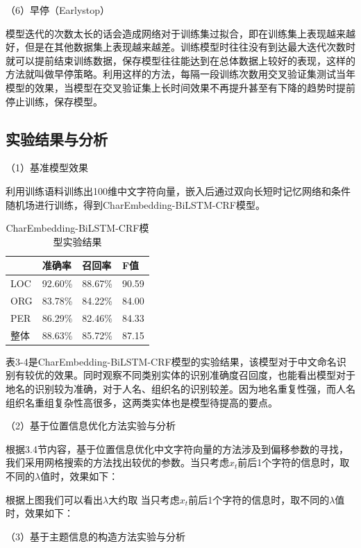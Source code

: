 \documentclass[winfonts,master,oneside,nobackinfo]{njuthesis}
\begin{document}
（6）早停（Earlystop）

模型迭代的次数太长的话会造成网络对于训练集过拟合，即在训练集上表现越来越好，但是在其他数据集上表现越来越差。训练模型时往往没有到达最大迭代次数时就可以提前结束训练数据，保存模型往往能达到在总体数据上较好的表现，这样的方法就叫做早停策略。利用这样的方法，每隔一段训练次数用交叉验证集测试当年模型的效果，当模型在交叉验证集上长时间效果不再提升甚至有下降的趋势时提前停止训练，保存模型。

\subsection{实验结果与分析}

（1）基准模型效果

利用训练语料训练出100维中文字符向量，嵌入后通过双向长短时记忆网络和条件随机场进行训练，得到CharEmbedding-BiLSTM-CRF模型。

\begin{table}[H]
\centering
\begin{tabular}{|l|l|l|l|}
\hline
    & 准确率     & 召回率     & F值    \\ \hline
LOC & 92.60\% & 88.67\% & 90.59 \\ \hline
ORG & 83.78\% & 84.22\% & 84.00 \\ \hline
PER & 86.29\% & 82.46\% & 84.33 \\ \hline
整体  & 88.63\% & 85.72\% & 87.15 \\ \hline
\end{tabular}
\caption{CharEmbedding-BiLSTM-CRF模型实验结果}
\end{table}

表3-4是CharEmbedding-BiLSTM-CRF模型的实验结果，该模型对于中文命名识别有较优的效果。同时观察不同类别实体的识别准确度召回度，也能看出模型对于地名的识别较为准确，对于人名、组织名的识别较差。因为地名重复性强，而人名组织名重组复杂性高很多，这两类实体也是模型待提高的要点。

（2）基于位置信息优化方法实验与分析

根据3.4节内容，基于位置信息优化中文字符向量的方法涉及到偏移参数的寻找，我们采用网格搜索的方法找出较优的参数。当只考虑$x_{t}$前后1个字符的信息时，取不同的$\lambda$值时，效果如下：



根据上图我们可以看出$\lambda$大约取
当只考虑$x_{t}$前后1个字符的信息时，取不同的$\lambda$值时，效果如下：


（3）基于主题信息的构造方法实验与分析
\end{document}
